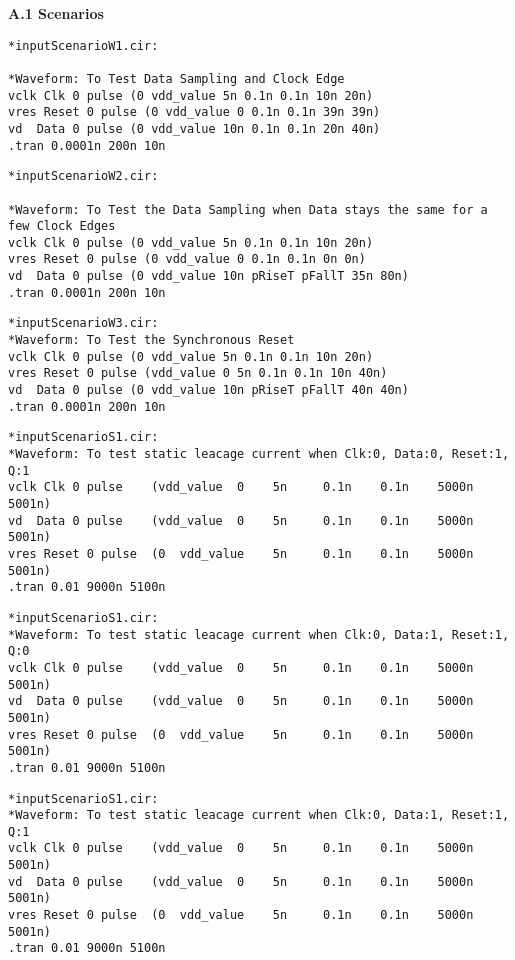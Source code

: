 \textbf{A.1 Scenarios}

\begin{lstlisting}
*inputScenarioW1.cir:

*Waveform: To Test Data Sampling and Clock Edge
vclk Clk 0 pulse (0 vdd_value 5n 0.1n 0.1n 10n 20n)     
vres Reset 0 pulse (0 vdd_value 0 0.1n 0.1n 39n 39n)       
vd  Data 0 pulse (0 vdd_value 10n 0.1n 0.1n 20n 40n)
.tran 0.0001n 200n 10n
\end{lstlisting}

\begin{lstlisting}
*inputScenarioW2.cir:

*Waveform: To Test the Data Sampling when Data stays the same for a few Clock Edges
vclk Clk 0 pulse (0 vdd_value 5n 0.1n 0.1n 10n 20n)     
vres Reset 0 pulse (0 vdd_value 0 0.1n 0.1n 0n 0n)       
vd  Data 0 pulse (0 vdd_value 10n pRiseT pFallT 35n 80n)     
.tran 0.0001n 200n 10n
\end{lstlisting}

\begin{lstlisting}
*inputScenarioW3.cir:
*Waveform: To Test the Synchronous Reset
vclk Clk 0 pulse (0 vdd_value 5n 0.1n 0.1n 10n 20n)     
vres Reset 0 pulse (vdd_value 0 5n 0.1n 0.1n 10n 40n)       
vd  Data 0 pulse (0 vdd_value 10n pRiseT pFallT 40n 40n)
.tran 0.0001n 200n 10n
\end{lstlisting}

\begin{lstlisting}
*inputScenarioS1.cir:
*Waveform: To test static leacage current when Clk:0, Data:0, Reset:1, Q:1
vclk Clk 0 pulse    (vdd_value  0    5n     0.1n    0.1n    5000n     5001n)     
vd  Data 0 pulse    (vdd_value  0    5n     0.1n    0.1n    5000n     5001n)   
vres Reset 0 pulse  (0  vdd_value    5n     0.1n    0.1n    5000n     5001n)   
.tran 0.01 9000n 5100n
\end{lstlisting}

\begin{lstlisting}
*inputScenarioS1.cir:
*Waveform: To test static leacage current when Clk:0, Data:1, Reset:1, Q:0
vclk Clk 0 pulse    (vdd_value  0    5n     0.1n    0.1n    5000n     5001n)     
vd  Data 0 pulse    (vdd_value  0    5n     0.1n    0.1n    5000n     5001n)   
vres Reset 0 pulse  (0  vdd_value    5n     0.1n    0.1n    5000n     5001n)   
.tran 0.01 9000n 5100n
\end{lstlisting}

\begin{lstlisting}
*inputScenarioS1.cir:
*Waveform: To test static leacage current when Clk:0, Data:1, Reset:1, Q:1
vclk Clk 0 pulse    (vdd_value  0    5n     0.1n    0.1n    5000n     5001n)     
vd  Data 0 pulse    (vdd_value  0    5n     0.1n    0.1n    5000n     5001n)   
vres Reset 0 pulse  (0  vdd_value    5n     0.1n    0.1n    5000n     5001n)   
.tran 0.01 9000n 5100n
\end{lstlisting}

